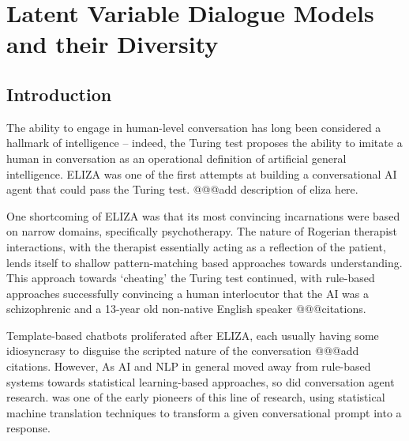 \chapter{Latent Variable Dialogue Models and their Diversity}
\label{chap:chatbot}

\ifpdf
    \graphicspath{{Chapter3/Figs/Raster/}{Chapter3/Figs/PDF/}{Chapter3/Figs/}}
\else
    \graphicspath{{Chapter3/Figs/Vector/}{Chapter3/Figs/}}
\fi

\section{Introduction}

The ability to engage in human-level conversation has long been considered a hallmark of intelligence -- indeed, the Turing test \citet{Turing:50} proposes the ability to imitate a human in conversation as an operational definition of artificial general intelligence. ELIZA \citep{Weizenbaum:66} was one of the first attempts at building a conversational AI agent that could pass the Turing test. @@@add description of eliza here.

One shortcoming of ELIZA was that its most convincing incarnations were based on narrow domains, specifically psychotherapy. The nature of Rogerian therapist interactions, with the therapist essentially acting as a reflection of the patient, lends itself to shallow pattern-matching based approaches towards understanding. This approach towards `cheating' the Turing test continued, with rule-based approaches successfully convincing a human interlocutor that the AI was a schizophrenic and a 13-year old non-native English speaker @@@citations.

Template-based chatbots proliferated after ELIZA, each usually having some idiosyncrasy to disguise the scripted nature of the conversation @@@add citations. However,  As AI and NLP in general moved away from rule-based systems towards statistical learning-based approaches, so did conversation agent research. \citet{Ritter:11} was one of the early pioneers of this line of research, using statistical machine translation techniques to transform a given conversational prompt into a response.

